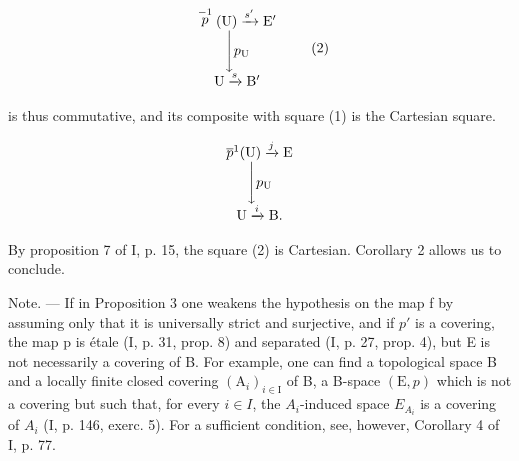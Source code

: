 \[
\begin{array}{c} \stackrel {{- 1}} {{p}} (\mathrm{U}) \xrightarrow {s ^ {\prime}} \mathrm{E} ^ {\prime} \\ \Biggl \downarrow p _ {\mathrm{U}} \\ \mathrm{U} \xrightarrow {s} \mathrm{B} ^ {\prime} \end{array}\tag{2}
\]

is thus commutative, and its composite with square (1) is the Cartesian square.

\[
\begin{array}{c} \overline {{p}} ^ {1} (\mathrm{U}) \xrightarrow {j} \mathrm{E} \\ \Biggl \downarrow p _ {\mathrm{U}} \\ \mathrm{U} \xrightarrow {i} \mathrm{B}. \end{array}
\]

By proposition 7 of I, p. 15, the square (2) is Cartesian. Corollary 2 allows us to conclude.

Note. --- If in Proposition 3 one weakens the hypothesis on the map f by assuming only that it is universally strict and surjective, and if \(p'\) is a covering, the map p is étale (I, p. 31, prop. 8) and separated (I, p. 27, prop. 4), but E is not necessarily a covering of B. For example, one can find a topological space B and a locally finite closed covering \((\mathrm{A}_{i})_{i\in\mathrm{I}}\) of B, a B-space \((\mathrm{E},p)\) which is not a covering but such that, for every \(i\in I\), the \(A_{i}\)-induced space \(E_{A_{i}}\) is a covering of \(A_{i}\) (I, p. 146, exerc. 5). For a sufficient condition, see, however, Corollary 4 of I, p. 77.

